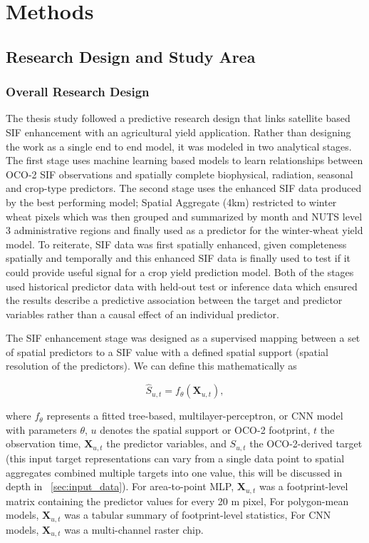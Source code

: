 \chapter{Methods\label{cha:chapter5}}

\section{Research Design and Study Area\label{sec:research_methods}}

\subsection{Overall Research Design}

The thesis study followed a predictive research design that links satellite based SIF enhancement with an agricultural yield application. Rather than designing the work as a single end to end model, it was modeled in two analytical stages. The first stage uses machine learning based models to learn relationships between OCO-2 SIF observations and spatially complete biophysical, radiation, seasonal and crop-type predictors. The second stage uses the enhanced SIF data produced by the best performing model; Spatial Aggregate (4km) restricted to winter wheat pixels which was then grouped and summarized by month and NUTS level 3 administrative regions and finally used as a predictor for the winter-wheat yield model. To reiterate, SIF data was first spatially enhanced, given completeness spatially and temporally and this enhanced SIF data is finally used to test if it could provide useful signal for a crop yield prediction model. Both of the stages used historical predictor data with held-out test or inference data which ensured the results describe a predictive association between the target and predictor variables rather than a causal effect of an individual predictor. 

The SIF enhancement stage was designed as a supervised mapping between a set of spatial predictors to a SIF value with a defined spatial support (spatial resolution of the predictors). We can define this mathematically as 

\begin{equation}
    \widehat{S}_{u,t} = f_{\theta}\!\left(\mathbf{X}_{u,t}\right),
    \label{eq:general_sif_mapping}
\end{equation}

where $f_{\theta}$ represents a fitted tree-based, multilayer-perceptron, or CNN model with parameters $\theta$, $u$ denotes the spatial support or OCO-2 footprint, $t$ the observation time, $\mathbf{X}_{u,t}$ the predictor variables, and $S_{u,t}$ the OCO-2-derived target (this input target representations can vary from a single data point to spatial aggregates combined multiple targets into one value, this will be discussed in depth in ~\ref{sec:input_data}). For area-to-point MLP, $\mathbf{X}_{u,t}$ was a footprint-level matrix containing the predictor values for every 20 m pixel, For polygon-mean models, $\mathbf{X}_{u,t}$ was a tabular summary of footprint-level statistics, For CNN models, $\mathbf{X}_{u,t}$ was a multi-channel raster chip.

